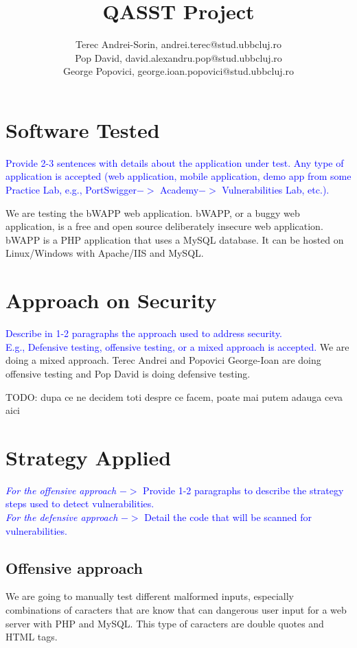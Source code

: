 \documentclass{article}
\title{\textbf{QASST Project}}
\author{Terec Andrei-Sorin, andrei.terec@stud.ubbcluj.ro\\
Pop David, david.alexandru.pop@stud.ubbcluj.ro\\
George Popovici, george.ioan.popovici@stud.ubbcluj.ro}
\begin{document}
\maketitle


\tableofcontents

\newpage

\section{Software Tested}
\label{label:Software_tested}

\textcolor{blue}{Provide 2-3 sentences with details about the application under test. Any type of application is accepted (web application, mobile application, demo app from some Practice Lab, e.g., PortSwigger$->$ Academy$->$ Vulnerabilities Lab, etc.).}

We are testing the bWAPP web application.
bWAPP, or a buggy web application, is a free and open source deliberately insecure web application.
bWAPP is a PHP application that uses a MySQL database. It can be hosted on Linux/Windows with Apache/IIS and MySQL.

\section{Approach on Security}
\label{}

\textcolor{blue}{Describe in 1-2 paragraphs the approach used to address security. \\
    E.g., Defensive testing, offensive testing, or a mixed approach is accepted.
}
We are doing a mixed approach.
Terec Andrei and Popovici George-Ioan are doing offensive testing and Pop David is doing defensive testing.

TODO: dupa ce ne decidem toti despre ce facem, poate mai putem adauga ceva aici

\section{Strategy Applied}
\label{}

\textcolor{blue}{\textit{For the offensive approach} $->$ Provide 1-2 paragraphs to describe the strategy steps used to detect vulnerabilities.\\
    \textit{For the defensive approach} $->$ Detail the code that will be scanned for vulnerabilities.
}

\subsection{Offensive approach}
We are going to manually test different malformed inputs, especially combinations of caracters that are know that can dangerous user input for a web server with PHP and MySQL.
This type of caracters are double quotes and HTML tags.
\end{document}
